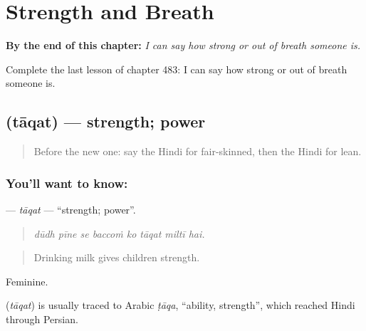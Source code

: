 
\chapter{Strength and Breath}
\label{ch:hi-strength-and-breath}

\begin{chapteropening}
\textbf{By the end of this chapter:} \emph{I can say how strong or out of breath someone is.}

Complete the last lesson of chapter 483: I can say how strong or out of breath someone is.
\end{chapteropening}

\section[\texorpdfstring{\hi{ताक़त} (tāqat)}{ताक़त (tāqat)}]{ (tāqat) — strength; power}

\label{lesson:HI-C483-taqat}



\begin{quote}
Before the new one: say the Hindi for fair-skinned, then the Hindi for lean.
\end{quote}

\subsection*{You'll want to know: }
\textbf{} — \emph{tāqat} — \textquotedblleft{}strength; power\textquotedblright{}.

\begin{quote}
       
\end{quote}

\begin{quote}
\emph{dūdh pīne se baccoṁ ko tāqat miltī hai.}
\end{quote}

\begin{quote}
Drinking milk gives children strength.
\end{quote}

Feminine.

\begin{cousinweb}
\textbf{} (\emph{tāqat}) is usually traced to Arabic \emph{ṭāqa}, \textquotedblleft{}ability, strength\textquotedblright{}, which reached Hindi through Persian.
\end{cousinweb}

